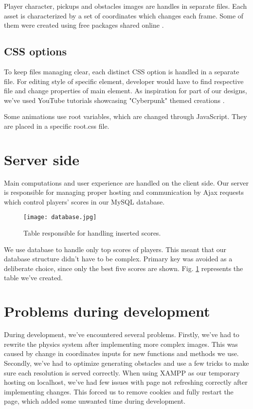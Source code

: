 \documentclass[oneside,a4paper,11pt]{report}
\begin{document}
\par
Player character, pickups and obstacles images are handles in separate files. Each asset is characterized by a set of coordinates which changes each frame. Some of them were created using free packages shared online \cite{Facade009} \cite{Kitbash}.

\subsection{CSS options}
To keep files managing clear, each distinct CSS option is handled in a separate file. For editing style of specific element, developer would have to find respective file and change properties of main element. As inspiration for part of our designs, we've used YouTube tutorials showcasing "Cyberpunk" themed creations \cite{CyberpunkCSS} \cite{GlitchCSS}.

\par
Some animations use root variables, which are changed through JavaScript. They are placed in a specific root.css file.

\section{Server side}
Main computations and user experience are handled on the client side. Our server is responsible for managing proper hosting and communication by Ajax requests which control players' scores in our MySQL database.

\begin{figure}[!htb]
	\centering
	\texttt{[image: database.jpg]}
	\caption{Table responsible for handling inserted scores.\label{fig:database}}
\end{figure}

\par
We use database to handle only top scores of players. This meant that our database structure didn't have to be complex. Primary key was avoided as a deliberate choice, since only the best five scores are shown. Fig. \ref{fig:database} represents the table we've created.

\section{Problems during development}
During development, we've encountered several problems. Firstly, we've had to rewrite the physics system after implementing more complex images. This was caused by change in coordinates inputs for new functions and methods we use. Secondly, we've had to optimize generating obstacles and use a few tricks to make sure each resolution is served correctly. When using XAMPP as our temporary hosting on localhost, we've had few issues with page not refreshing correctly after implementing changes. This forced us to remove cookies and fully restart the page, which added some unwanted time during development.
\end{document}

